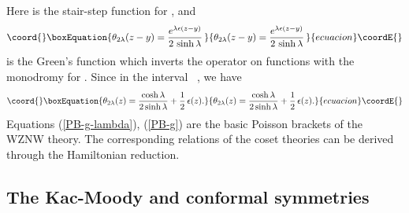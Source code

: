 \documentclass[a4paper,12pt]{article}
\providecommand{\rr}{\mathbb{R}}
\begin{document}
Here \coordHE{} is the stair-step function \coordHE{}
for \coordHE{}, and
\begin{equation}\coord{}\boxEquation{\label{theta_lambda}
\theta_{2\lambda} (z-y)=\frac{e^{\lambda \epsilon(z-y)}}{2\,\sinh\lambda}\,
}{\theta_{2\lambda} (z-y)=\frac{e^{\lambda \epsilon(z-y)}}{2\,\sinh\lambda}\,
}{ecuacion}\coordE{}\end{equation}
is the Green's function \cite{Thorn} which
inverts  the operator \coordHE{} on
functions \coordHE{} with the monodromy \coordHE{}
for \coordHE{}.
Since in the interval \coordHE{} \, \coordHE{},
we have
\begin{equation}\coord{}\boxEquation{\label{theta_lambda1}
\theta_{2\lambda} (z)=\frac{\cosh\lambda}{2\sinh\lambda}+
\frac{1}{2}\,\epsilon (z).
}{\theta_{2\lambda} (z)=\frac{\cosh\lambda}{2\sinh\lambda}+
\frac{1}{2}\,\epsilon (z).
}{ecuacion}\coordE{}\end{equation}
Equations (\ref{PB-g-lambda}), (\ref{PB-g}) are the basic Poisson
brackets of the \myHighlight{$SL(2,\rr)$}\coordHE{} WZNW theory.
The corresponding relations of the coset theories can be derived
through the Hamiltonian reduction.


\subsection{The Kac-Moody and conformal symmetries}
\end{document}
